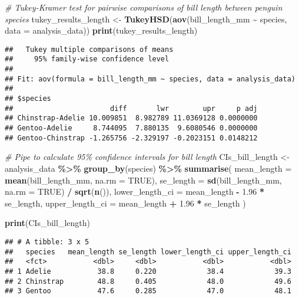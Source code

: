 \documentclass[
]{article}
\newenvironment{Shaded}{\begin{snugshade}}{\end{snugshade}}
\newcommand{\AttributeTok}[1]{\textcolor[rgb]{0.13,0.29,0.53}{#1}}
\newcommand{\CommentTok}[1]{\textcolor[rgb]{0.56,0.35,0.01}{\textit{#1}}}
\newcommand{\ConstantTok}[1]{\textcolor[rgb]{0.56,0.35,0.01}{#1}}
\newcommand{\FloatTok}[1]{\textcolor[rgb]{0.00,0.00,0.81}{#1}}
\newcommand{\FunctionTok}[1]{\textcolor[rgb]{0.13,0.29,0.53}{\textbf{#1}}}
\newcommand{\NormalTok}[1]{#1}
\newcommand{\OtherTok}[1]{\textcolor[rgb]{0.56,0.35,0.01}{#1}}
\newcommand{\SpecialCharTok}[1]{\textcolor[rgb]{0.81,0.36,0.00}{\textbf{#1}}}
\begin{document}
\begin{Shaded}
\begin{Highlighting}[]
\CommentTok{\# Tukey{-}Kramer test for pairwise comparisons of bill length between penguin species}
\NormalTok{tukey\_results\_length }\OtherTok{\textless{}{-}} \FunctionTok{TukeyHSD}\NormalTok{(}\FunctionTok{aov}\NormalTok{(bill\_length\_mm }\SpecialCharTok{\textasciitilde{}}\NormalTok{ species, }\AttributeTok{data =}\NormalTok{ analysis\_data))}
\FunctionTok{print}\NormalTok{(tukey\_results\_length)}
\end{Highlighting}
\end{Shaded}

\begin{verbatim}
##   Tukey multiple comparisons of means
##     95% family-wise confidence level
## 
## Fit: aov(formula = bill_length_mm ~ species, data = analysis_data)
## 
## $species
##                       diff       lwr        upr     p adj
## Chinstrap-Adelie 10.009851  8.982789 11.0369128 0.0000000
## Gentoo-Adelie     8.744095  7.880135  9.6080546 0.0000000
## Gentoo-Chinstrap -1.265756 -2.329197 -0.2023151 0.0148212
\end{verbatim}

\begin{Shaded}
\begin{Highlighting}[]
\CommentTok{\# Pipe to calculate 95\% confidence intervals for bill length}
\NormalTok{CIs\_bill\_length }\OtherTok{\textless{}{-}}\NormalTok{ analysis\_data }\SpecialCharTok{\%\textgreater{}\%}
  \FunctionTok{group\_by}\NormalTok{(species) }\SpecialCharTok{\%\textgreater{}\%}
  \FunctionTok{summarise}\NormalTok{(}
    \AttributeTok{mean\_length =} \FunctionTok{mean}\NormalTok{(bill\_length\_mm, }\AttributeTok{na.rm =} \ConstantTok{TRUE}\NormalTok{),}
    \AttributeTok{se\_length =} \FunctionTok{sd}\NormalTok{(bill\_length\_mm, }\AttributeTok{na.rm =} \ConstantTok{TRUE}\NormalTok{) }\SpecialCharTok{/} \FunctionTok{sqrt}\NormalTok{(}\FunctionTok{n}\NormalTok{()),}
    \AttributeTok{lower\_length\_ci =}\NormalTok{ mean\_length }\SpecialCharTok{{-}} \FloatTok{1.96} \SpecialCharTok{*}\NormalTok{ se\_length,}
    \AttributeTok{upper\_length\_ci =}\NormalTok{ mean\_length }\SpecialCharTok{+} \FloatTok{1.96} \SpecialCharTok{*}\NormalTok{ se\_length}
\NormalTok{  )}

\FunctionTok{print}\NormalTok{(CIs\_bill\_length)}
\end{Highlighting}
\end{Shaded}

\begin{verbatim}
## # A tibble: 3 x 5
##   species   mean_length se_length lower_length_ci upper_length_ci
##   <fct>           <dbl>     <dbl>           <dbl>           <dbl>
## 1 Adelie           38.8     0.220            38.4            39.3
## 2 Chinstrap        48.8     0.405            48.0            49.6
## 3 Gentoo           47.6     0.285            47.0            48.1
\end{verbatim}
\end{document}
